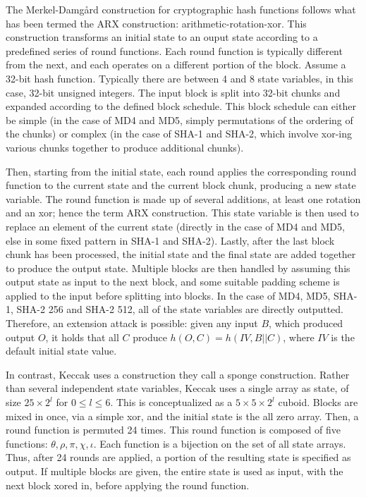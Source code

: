 \documentclass[10pt,twocolumn,twoside]{pnas-new}
\begin{document}
    The Merkel-Damg{\aa}rd construction for cryptographic hash functions
follows what has been termed the ARX construction: arithmetic-rotation-xor.
This construction transforms an initial state to an ouput state according to
a predefined series of round functions. Each round function is typically
different from the next, and each operates on a different portion of the block.
Assume a 32-bit hash function. Typically there are between 4 and 8 state
variables, in this case, 32-bit unsigned integers. The input block is split
into 32-bit chunks and expanded according to the defined block schedule.
This block schedule can either be simple (in the case of MD4 and MD5, simply
permutations of the ordering of the chunks) or complex (in the case of SHA-1
and SHA-2, which involve xor-ing various chunks together to produce additional
chunks).

    Then, starting from the initial state, each round applies the corresponding
round function to the current state and the current block chunk, producing a
new state variable. The round function is made up of several additions,
at least one rotation and an xor; hence the term ARX construction.
This state variable is then used to replace an element of
the current state (directly in the case of MD4 and MD5, else in some fixed
pattern in SHA-1 and SHA-2). Lastly, after the last block chunk has been
processed, the initial state and the final state are added together to produce
the output state. Multiple blocks are then handled by assuming this output
state as input to the next block, and some suitable padding scheme is applied
to the input before splitting into blocks. In the case of MD4, MD5, SHA-1,
SHA-2 256 and SHA-2 512, all of the state variables are directly outputted.
Therefore, an extension attack is possible: given any input $B$, which
produced output $O$, it holds that all $C$ produce $h(O, C) = h(IV, B || C)$,
where $IV$ is the default initial state value.

    In contrast, Keccak uses a construction they call a sponge construction.
Rather than several independent state variables, Keccak uses a single
array as state, of size $25 \times 2^{l}$ for $0 \leq l \leq 6$. This is
conceptualized as a $5 \times 5 \times 2^{l}$ cuboid. Blocks are mixed in
once, via a simple xor, and the initial state is the all zero array. Then,
a round function is permuted 24 times. This round function is composed of
five functions: $\theta, \rho, \pi, \chi, \iota$. Each function is a bijection
on the set of all state arrays. Thus, after 24 rounds are applied, a portion
of the resulting state is specified as output. If multiple blocks are given,
the entire state is used as input, with the next block xored in, before
applying the round function.
\end{document}
